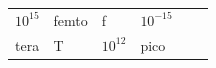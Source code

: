 {\begin{tabular}[t]{|l|l|l|l|l|l|}
                \begin{math}{10}^{15}\end{math}
               &
    
    
        femto &
    
    
        f &
    
    
        
                \begin{math}{10}^{-15}\end{math}
     \tabularnewline\cline{1-1}\cline{2-2}\cline{3-3}\cline{4-4}\cline{5-5}\cline{6-6}
    
    
        tera &
    
    
        T &
    
    
        
                \begin{math}{10}^{12}\end{math}
               &
    
    
        pico &
    

\end{tabular}}
